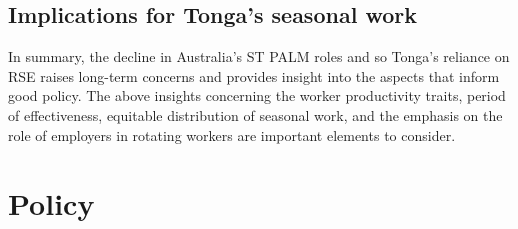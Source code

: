 \documentclass[9pt,a4paper,twocolumn,twoside]{tau-class/tau}
\begin{document}
         
         
         \subsection*{Implications for Tonga's seasonal work}
         
        In summary, the decline in Australia’s ST PALM roles and so Tonga’s reliance on RSE raises long-term concerns and provides insight into the aspects that inform good policy. The above insights concerning the worker productivity traits, period of effectiveness, equitable distribution of seasonal work, and the emphasis on the role of employers in rotating workers are important elements to consider.
        
        
        
        
         
         
         
         
         
 


\section{Policy}
\end{document}
